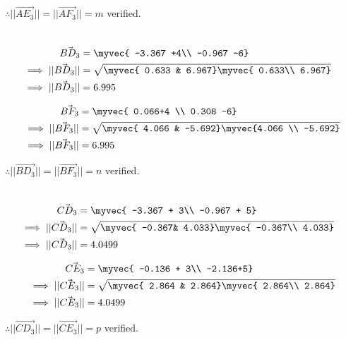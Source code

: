 \documentclass[journal,12pt,twocolumn]{IEEEtran}
\theoremstyle{remark}
\begin{document}
$\therefore ||\vec{AE_3}||= ||\vec{AF_3}||=m $ verified.


\begin{align}
	\\
	\vec{BD_3}&=\myvec{ -3.367 +4\\ 
                -0.967 -6}\\
\implies	||\vec{BD_3}||&=\sqrt{\myvec{ 0.633  &
       6.967}
       \myvec{ 0.633\\ 
       6.967}} \\
\implies	||\vec{BD_3}||&=6.995 
\end{align}






\begin{align}
	\vec{BF_3}&=\myvec{ 0.066+4 \\
         0.308 -6}\\                              
\implies	||\vec{BF_3}||&=\sqrt{\myvec{ 4.066 &
       -5.692}
       \myvec{4.066 \\ 
       -5.692}} \\
\implies	||\vec{BF_3}||&=6.995 
\end{align}           


$\therefore ||\vec{BD_3}||= ||\vec{BF_3}||=n $ verified.






\begin{align}
	\\
	\vec{CD_3}&=\myvec{ -3.367 + 3\\
       -0.967 + 5}\\
\implies	||\vec{CD_3}||&=\sqrt{\myvec{ -0.367&
       4.033}
       \myvec{ -0.367\\
       4.033}} \\
\implies	||\vec{CD_3}||&=4.0499 
\end{align}           







\begin{align}
	\vec{CE_3}&=\myvec{ -0.136 + 3\\ 
       -2.136+5}\\
\implies	||\vec{CE_3}||&=\sqrt{\myvec{ 2.864 &
       2.864}
       \myvec{ 2.864\\ 
       2.864}}\\
\implies	||\vec{CE_3}||&= 4.0499 
\end{align}           


$\therefore ||\vec{CD_3}||= ||\vec{CE_3}||=p $ verified.







\end{document}
